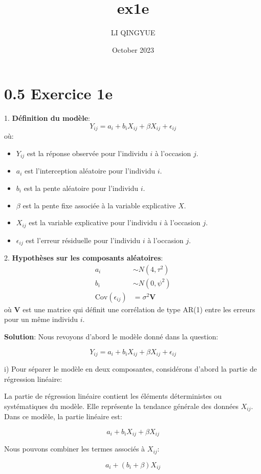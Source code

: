 \documentclass{article}
\title{ex1e}
\author{LI QINGYUE}
\date{October 2023}
\begin{document}
\section*{0.5 Exercice 1e}

1. \textbf{Définition du modèle}:
\[ Y_{ij} = a_i + b_i X_{ij} + \beta X_{ij} + \epsilon_{ij} \]
où:
\begin{itemize}
    \item \( Y_{ij} \) est la réponse observée pour l'individu \( i \) à l'occasion \( j \).
    \item \( a_i \) est l'interception aléatoire pour l'individu \( i \).
    \item \( b_i \) est la pente aléatoire pour l'individu \( i \).
    \item \( \beta \) est la pente fixe associée à la variable explicative \( X \).
    \item \( X_{ij} \) est la variable explicative pour l'individu \( i \) à l'occasion \( j \).
    \item \( \epsilon_{ij} \) est l'erreur résiduelle pour l'individu \( i \) à l'occasion \( j \).
\end{itemize}

2. \textbf{Hypothèses sur les composants aléatoires}:
\begin{align*}
    a_i &\sim N(4, \tau^2) \\
    b_i &\sim N(0, \psi^2) \\
    \text{Cov}(\epsilon_{ij}) &= \sigma^2 \bm{V}
\end{align*}
où \( \bm{V} \) est une matrice qui définit une corrélation de type AR(1) entre les erreurs pour un même individu \( i \).

\textbf{Solution}:
Nous revoyons d'abord le modèle donné dans la question:

\[
Y_{ij} = a_i + b_i X_{ij} + \beta X_{ij} + \epsilon_{ij}
\]

i) Pour séparer le modèle en deux composantes, considérons d'abord la partie de régression linéaire:

La partie de régression linéaire contient les éléments déterministes ou systématiques du modèle. Elle représente la tendance générale des données \(X_{ij}\). Dans ce modèle, la partie linéaire est:

\[
a_i + b_i X_{ij} + \beta X_{ij}
\]

Nous pouvons combiner les termes associés à \(X_{ij}\):

\[
a_i + (b_i + \beta) X_{ij}
\]
\end{document}
